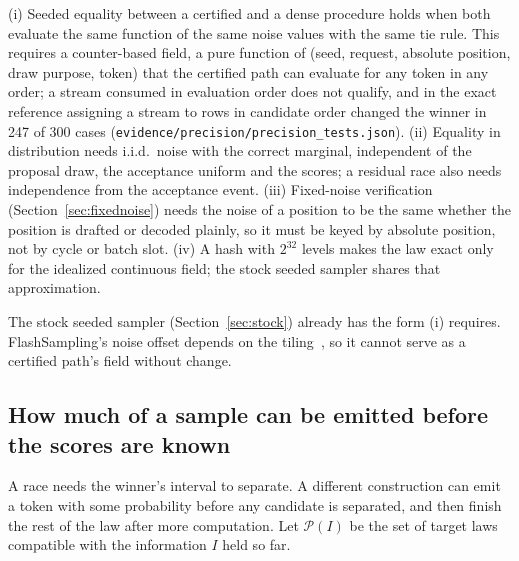 \begin{proposition}\label{prop:rng}
(i) Seeded equality between a certified and a dense procedure holds when both evaluate the same function of the same noise values with the same tie rule. This requires a counter-based field, a pure function of (seed, request, absolute position, draw purpose, token) that the certified path can evaluate for any token in any order; a stream consumed in evaluation order does not qualify, and in the exact reference assigning a stream to rows in candidate order changed the winner in 247 of 300 cases (\nolinkurl{evidence/precision/precision_tests.json}). (ii) Equality in distribution needs i.i.d.\ noise with the correct marginal, independent of the proposal draw, the acceptance uniform and the scores; a residual race also needs independence from the acceptance event. (iii) Fixed-noise verification (Section~\ref{sec:fixednoise}) needs the noise of a position to be the same whether the position is drafted or decoded plainly, so it must be keyed by absolute position, not by cycle or batch slot. (iv) A hash with $2^{32}$ levels makes the law exact only for the idealized continuous field; the stock seeded sampler shares that approximation.
\end{proposition}
The stock seeded sampler (Section~\ref{sec:stock}) already has the form (i) requires. FlashSampling's noise offset depends on the tiling~\cite{flashsampling}, so it cannot serve as a certified path's field without change.

\subsection{How much of a sample can be emitted before the scores are known}\label{sec:commonmass}
A race needs the winner's interval to separate. A different construction can emit a token with some probability before any candidate is separated, and then finish the rest of the law after more computation. Let $\mathcal P(I)$ be the set of target laws compatible with the information $I$ held so far.

